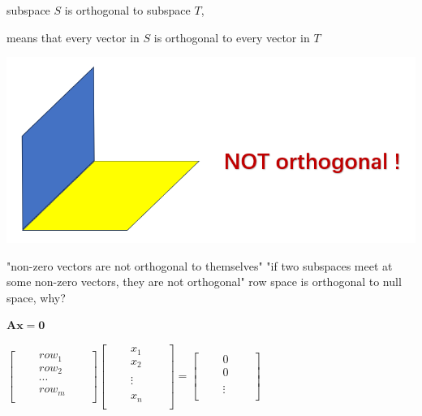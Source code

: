 \documentclass[12pt, a4paper]{article}
\begin{document}
{\newline
subspace $S$ is orthogonal to subspace $T$, 
\par means that every vector in $S$ is orthogonal to every vector in $T$
\begin{center}
	\includegraphics[scale=0.4]{figures/S14-2.png}
\end{center}
"non-zero vectors are not orthogonal to themselves"
\newline
"if two subspaces meet at some non-zero vectors, they are not orthogonal"
\vspace{14pt}
\newline
row space is orthogonal to null space, why?
\par ${\mathbf{A}}{\mathbf{x}}={\mathbf{0}}$
\par 
\begin{math}
	\begin{bmatrix}
		\quad & row_1 & \quad \\
		\quad & row_2 & \quad \\
		\quad & \cdots & \quad \\
		\quad & row_m & \quad \\
	\end{bmatrix}
	\begin{bmatrix}
		\quad & x_1 & \quad \\
		\quad & x_2 & \quad \\
		\ & \ & \ \\
		\quad & \vdots & \quad \\
		\ & \ & \ \\
		\quad & x_n & \quad \\
	\end{bmatrix}
	 = 
	\begin{bmatrix}
		\quad & 0 & \quad \\
		\quad & 0 & \quad \\
		\ & \ & \ \\
		\quad & \vdots & \quad \\

\end{bmatrix}
\end{math}}
\end{document}
